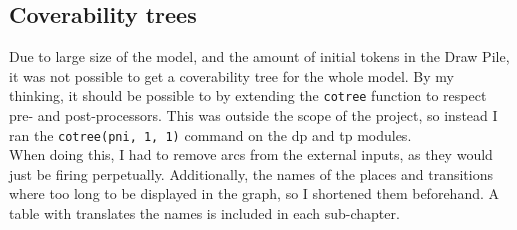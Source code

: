 \documentclass[runningheads,a4paper]{llncs}
\begin{document}
\subsection{Coverability trees}
Due to large size of the model, and the amount of initial tokens in the Draw Pile, it was not possible to get a coverability tree for the whole model. By my thinking, it should be possible to by extending the \verb!cotree! function to respect pre- and post-processors. This was outside the scope of the project, so instead I ran the \verb!cotree(pni, 1, 1)! command on the \ac{dp} and \ac{tp} modules.\\

When doing this, I had to remove arcs from the external inputs, as they would just be firing perpetually. Additionally, the names of the places and transitions where too long to be displayed in the graph, so I shortened them beforehand. A table with translates the names is included in each sub-chapter.
\end{document}
